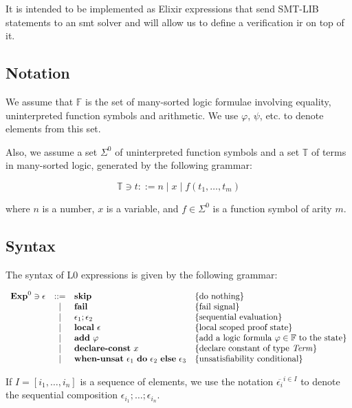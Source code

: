 It is intended to be implemented as Elixir expressions that send SMT-LIB 
statements to an \acrshort{smt} solver and will allow us to define a
verification \gls{ir} on top of it.

\subsection{Notation}

We assume that $\mathbb{F}$ is the set of many-sorted logic formulae involving
equality, uninterpreted function symbols and arithmetic. We use $\varphi$, 
$\psi$, etc. to denote elements from this set.

Also, we assume a set $\Sigma^{0}$ of uninterpreted function symbols and a set
$\mathbb{T}$ of terms in many-sorted logic, generated by the following grammar:

\[
\mathbb{T} \ni t ::= n \mid x \mid f(t_1, \ldots, t_m)
\]

where $n$ is a number, $x$ is a variable, and $f \in \Sigma^{0}$ is a function 
symbol of arity $m$.

\subsection{Syntax}

The syntax of L0 expressions is given by the following grammar:

\[
\begin{array}{rcll}
\mathbf{Exp}^{0} \ni \epsilon & ::= & \textbf{skip} & \{ \textrm{do nothing} \}\\
& | & \textbf{fail} & \{ \textrm{fail signal} \}\\
& | & \epsilon_1;\epsilon_2 & \{ \textrm{sequential evaluation} \}\\
& | & \textbf{local}~\epsilon & \{ \textrm{local scoped proof state} \}\\
& | & \textbf{add}~\varphi &  \{ \textrm{add a logic formula $\varphi \in \mathbb{F}$ to the state} \}\\
& | & \textbf{declare-const}~x &  \{ \textrm{declare constant of type $\mathit{Term}$} \}\\
& | & \textbf{when-unsat}~\epsilon_1~\textbf{do}~\epsilon_2~\textbf{else}~\epsilon_3 &  \{ \textrm{unsatisfiability conditional} \}\\
\end{array}
\]

If $I = [i_1, \ldots, i_n]$ is a sequence of elements, we use the notation
$\overline{\epsilon_i}^{i \in I}$ to denote the sequential composition 
$\epsilon_{i_1};\dots;\epsilon_{i_n}$.

